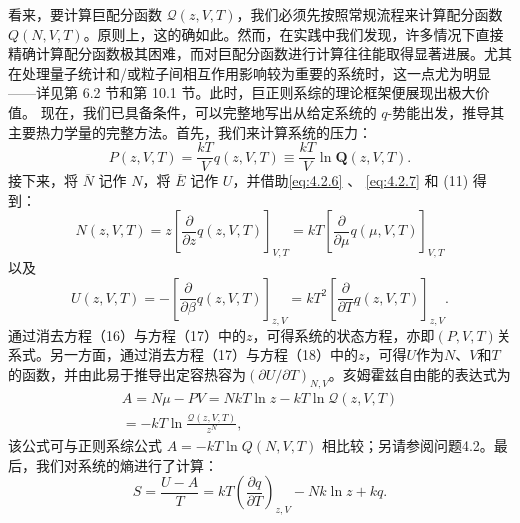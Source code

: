 看来，要计算巨配分函数 \(\mathcal{Q}(z,V,T)\)，我们必须先按照常规流程来计算配分函数 \(Q(N,V,T)\)。原则上，这的确如此。然而，在实践中我们发现，许多情况下直接精确计算配分函数极其困难，而对巨配分函数进行计算往往能取得显著进展。尤其在处理量子统计和/或粒子间相互作用影响较为重要的系统时，这一点尤为明显——详见第 6.2 节和第 10.1 节。此时，巨正则系综的理论框架便展现出极大价值。
现在，我们已具备条件，可以完整地写出从给定系统的 \(q\)-势能出发，推导其主要热力学量的完整方法。首先，我们来计算系统的压力：
\begin{equation}\tag{4.3.16}\label{eq:4.3.16}
P(z,V,T)=\frac{kT}Vq(z,V,T)\equiv\frac{kT}V\ln\boldsymbol{Q}(z,V,T).
\end{equation}
接下来，将 \(\overline{N}\) 记作 \(N\)，将 \(\overline{E}\) 记作 \(U\)，并借助\autoref{eq:4.2.6} 、 \autoref{eq:4.2.7} 和 (11) 得到：
\begin{equation}\tag{4.3.17}\label{eq:4.3.17}
N ( z , V , T ) = z \left[ \frac { \partial } { \partial z } q ( z , V , T ) \right] _ { V , T } = k T \left[ \frac { \partial } { \partial \mu } q ( \mu , V , T ) \right] _ { V , T }
\end{equation}
以及
\begin{equation}\tag{4.3.18}\label{eq:4.3.18}
U ( z , V , T ) = - \left[ \frac { \partial } { \partial \beta } q ( z , V , T ) \right] _ { z , V } = k T ^{2} \left[ \frac { \partial } { \partial T } q ( z , V , T ) \right] _ { z , V } .
\end{equation}
通过消去方程（16）与方程（17）中的\(z\)，可得系统的状态方程，亦即\((P,V,T)\)关系式。另一方面，通过消去方程（17）与方程（18）中的\(z\)，可得\(U\)作为\(N\)、\(V\)和\(T\)的函数，并由此易于推导出定容热容为\((\partial U/\partial T)_{N,V}\)。亥姆霍兹自由能的表达式为
\begin{equation}\tag{4.3.19}\label{eq:4.3.19}
\begin{array}{r} { A = N \mu - P V = N k T \ln z - k T \ln \mathcal { Q } ( z , V , T ) } \\{ = - k T \ln \frac { \mathcal { Q } ( z , V , T ) } { z ^{N} } , } \end{array}
\end{equation}
该公式可与正则系综公式 \(A = -kT\ln Q(N,V,T)\) 相比较；另请参阅问题4.2。最后，我们对系统的熵进行了计算：
\begin{equation}\tag{4.3.20}\label{eq:4.3.20}
S = \frac { U - A } { T } = k T \left( \frac { \partial q } { \partial T } \right) _ { z , V } - N k \ln z + k q .
\end{equation}
